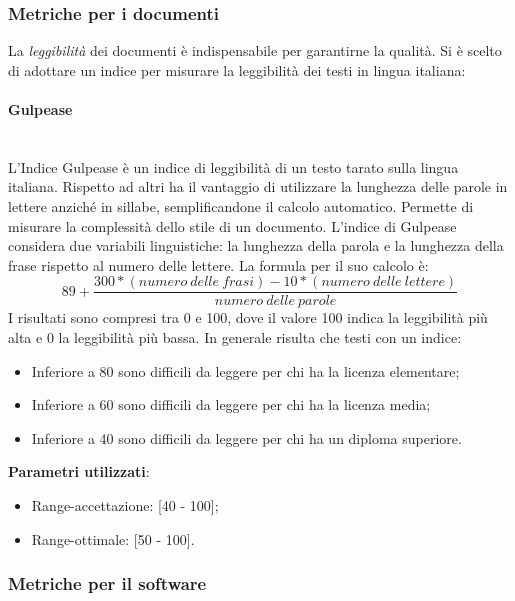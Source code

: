 		\subsubsection{Metriche per i documenti}
		
		La \emph{leggibilità} dei documenti è indispensabile per garantirne la qualità. Si è scelto di adottare un indice per misurare la leggibilità dei testi in lingua italiana:
			
			\paragraph{Gulpease}\mbox{} \\
			
			L'Indice Gulpease è un indice di leggibilità di un testo tarato sulla lingua italiana. Rispetto ad altri ha il vantaggio di utilizzare la lunghezza delle parole in lettere anziché in sillabe, semplificandone il calcolo automatico. Permette di misurare la complessità dello stile di un documento.
			L'indice di Gulpease considera due variabili linguistiche: la lunghezza della parola e la lunghezza della frase rispetto al numero delle lettere.
			La formula per il suo calcolo è: \\
			\[
			89 + \frac{300 * (numero\ delle\ frasi) - 10 * (numero\ delle\ lettere)}{numero\ delle\ parole}
			\]
			I risultati sono compresi tra 0 e 100, dove il valore 100 indica la leggibilità più alta e 0 la leggibilità più bassa. In generale risulta che testi con un indice:
			\begin{itemize}
				\item Inferiore a 80 sono difficili da leggere per chi ha la licenza elementare;
				\item Inferiore a 60 sono difficili da leggere per chi ha la licenza media;
				\item Inferiore a 40 sono difficili da leggere per chi ha un diploma superiore.
			\end{itemize}
			\textbf{Parametri utilizzati}:
			\begin{itemize}
				\item Range-accettazione: [40 - 100];
				\item Range-ottimale: [50 - 100].
			\end{itemize}
			
		\subsubsection{Metriche per il software}

